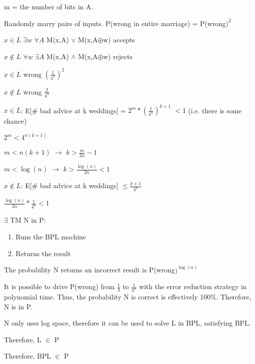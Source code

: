 \documentclass{article}
\begin{document}
m = the number of bits in A.


\medskip
Randomly marry pairs of inputs.  P(wrong in entire marriage) = P(wrong$)^2$


\medskip
$x\in L$ $\exists w $ $\forall A$ M(x,A) $\lor$ M(x,A$\oplus$w) accepts

$x\notin L$ $\forall w $ $\exists A$ M(x,A) $\land$ M(x,A$\oplus$w) rejects


\medskip
$x\in L$ wrong $(\frac1{4^n})^2$

$x\notin L$ wrong $\frac2{4^n}$


\medskip
$x\in L$: E[\# bad advice at k weddings] = $2^m*(\frac1{4^n})^{k+1}$ $< 1$ (i.e. there is some chance)

$2^m < 4^{n(k+1)}$

$m < n(k+1)$ $\rightarrow$ $k > \frac{m}{2n}-1$

$m < \log(n)$ $\rightarrow$ $k > \frac{\log(n)}{2n} < 1$

\medskip
$x\notin L$: E[\# bad advice at k weddings] $\leq \frac{k+1}{4^n}$

$\frac{\log(n)}{2n}*\frac1{4^n} < 1$

\medskip
$\exists$ TM N in P:
\begin{enumerate}[label=]
\item Runs the BPL machine
\item Returns the result
\end{enumerate}


\medskip
The probability N returns an incorrect result is P(wrong$)^{\log(n)}$

It is possible to drive P(wrong) from $\frac13$ to $\frac1{3^n}$ with the error reduction strategy in polynomial time.  Thus, the probability N is correct is effectively 100\%.  Therefore, N is in P.

N only uses log space, therefore it can be used to solve L in BPL, satisfying BPL.

Therefore, L $\in$ P

Therefore, BPL $\in$ P
\end{document}
